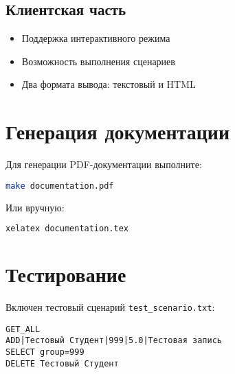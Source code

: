 \documentclass[a4paper,12pt]{article}
\begin{document}
\subsection{Клиентская часть}
\begin{itemize}
\item Поддержка интерактивного режима
\item Возможность выполнения сценариев
\item Два формата вывода: текстовый и HTML
\end{itemize}

\section{Генерация документации}
Для генерации PDF-документации выполните:
\begin{lstlisting}[language=bash]
make documentation.pdf
\end{lstlisting}

Или вручную:
\begin{lstlisting}[language=bash]
xelatex documentation.tex
\end{lstlisting}

\section{Тестирование}
Включен тестовый сценарий \texttt{test\_scenario.txt}:
\begin{lstlisting}
GET_ALL
ADD|Тестовый Студент|999|5.0|Тестовая запись
SELECT group=999
DELETE Тестовый Студент
\end{lstlisting}
\end{document}
